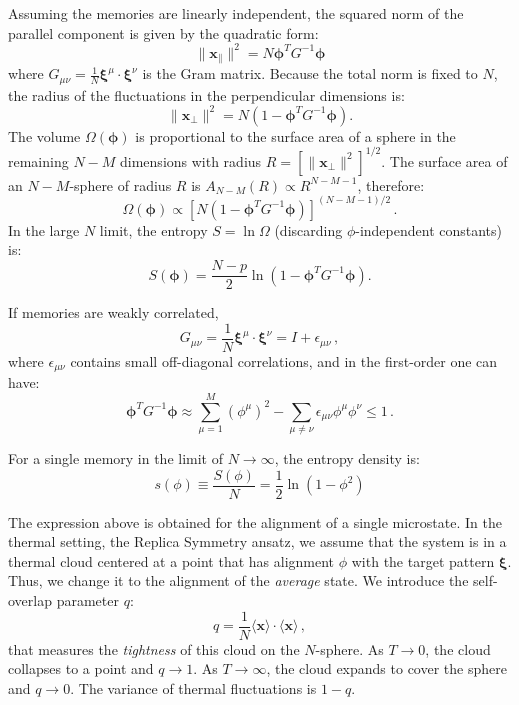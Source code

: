 \documentclass{article}
\theoremstyle{plain}
\theoremstyle{definition}
\theoremstyle{remark}
\begin{document}
Assuming the memories are linearly independent, the squared norm of the parallel component is given by the quadratic form:
\begin{equation}
    \|\mathbf{x}_{\parallel}\|^2 = N \bm{\phi}^T G^{-1} \bm{\phi}
\end{equation}
where $G_{\mu\nu} = \frac{1}{N} \bm{\xi}^\mu \cdot \bm{\xi}^\nu$ is the Gram matrix. Because the total norm is fixed to $N$, the radius of the fluctuations in the perpendicular dimensions is:
\begin{equation}
    \|\mathbf{x}_{\perp}\|^2 = N \left( 1 - \bm{\phi}^T G^{-1} \bm{\phi} \right).
\end{equation}
The volume $\Omega(\bm{\phi})$ is proportional to the surface area of a sphere in the remaining $N-M$ dimensions with radius $R = [\|\mathbf{x}_{\perp}\|^2]^{1/2}$. The surface area of an $N-M$-sphere of radius $R$ is $A_{N-M}(R) \propto R^{N-M-1}$, therefore:
\begin{equation}
    \Omega(\bm{\phi}) \propto \left[ N \left( 1 - \bm{\phi}^T G^{-1} \bm{\phi} \right) \right]^{(N-M-1)/2}\,.
\end{equation}
In the large $N$ limit, the entropy $S = \ln \Omega$ (discarding $\phi$-independent constants) is:
\begin{equation}
    S(\bm{\phi}) = \frac{N-p}{2} \ln \left( 1 - \bm{\phi}^T G^{-1} \bm{\phi} \right).
\end{equation}

If memories are weakly correlated,  
\begin{equation}
    G_{\mu\nu} = \frac{1}{N} \bm{\xi}^\mu \cdot \bm{\xi}^\nu = I + \epsilon_{\mu\nu}\,,
\end{equation}
where $\epsilon_{\mu\nu}$ contains small off-diagonal correlations, and
in the first-order one can have:
\begin{equation}
    \bm{\phi}^T G^{-1} \bm{\phi} \approx \sum_{\mu=1}^{M} (\phi^\mu)^2 - \sum_{\mu \neq \nu} \epsilon_{\mu\nu} \phi^\mu \phi^\nu \le 1\,.
    \label{eq:gram1}
\end{equation}

For a single memory in the limit of $N\to \infty$, the entropy density is:
\begin{equation}
    s(\phi) \equiv \frac{S(\phi)}N = \frac12 \ln ( 1 - \phi^2 )
\end{equation}

The expression above is obtained for the alignment of a single microstate. In the thermal setting, the Replica Symmetry ansatz,  we assume that the system is in a thermal cloud centered at a point that has alignment $\phi$ with the target pattern $\bm{\xi}$. Thus, we change it to the alignment of the \textit{average} state.  We introduce the self-overlap parameter $q$:
\begin{equation}
    q = \frac{1}{N} \langle \bm{x} \rangle \cdot \langle \bm{x} \rangle\,,
\end{equation}
that measures the \textit{tightness} of this cloud on the $N$-sphere. As $T \to 0$, the cloud collapses to a point and $q \to 1$. As $T \to \infty$, the cloud expands to cover the sphere and $q \to 0$. The variance of thermal fluctuations is $1-q$.
\end{document}
